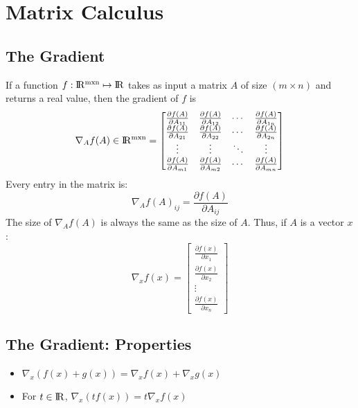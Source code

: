 \documentclass{article}
\begin{document}
\section{Matrix Calculus}
\subsection{The Gradient}
If a function $f:{\rm I\!R^{mxn}} \mapsto {\rm I\!R}$ takes as input a matrix $A$ of size $(m\times n)$ and returns a real value, then the gradient of $f$ is
\newline
$$\nabla_A f(A) \in {\rm I\!R^{mxn}} = \begin{bmatrix}
    \frac{\partial f(A)}{\partial A_{11}} & \frac{\partial f(A)}{\partial A_{12}} & \cdots & \frac{\partial f(A)}{\partial A_{1n}} \\
    \frac{\partial f(A)}{\partial A_{21}} & \frac{\partial f(A)}{\partial A_{22}} & \cdots & \frac{\partial f(A)}{\partial A_{2n}} \\
    \vdots & \vdots & \ddots & \vdots \\
    \frac{\partial f(A)}{\partial A_{m1}} & \frac{\partial f(A)}{\partial A_{m2}} & \cdots & \frac{\partial f(A)}{\partial A_{mn}}
\end{bmatrix}
$$
\newline
Every entry in the matrix is: $$\nabla_A f(A)_{ij} = \frac{\partial f(A)}{\partial A_{ij}}$$
\newline
The size of $\nabla_A f(A)$ is always the same as the size of $A$. Thus, if $A$ is a vector $x$:
$$\nabla_x f(x) = \begin{bmatrix}
	\frac{\partial f(x)}{\partial x_{1}} \\
    \frac{\partial f(x)}{\partial x_{2}} \\
    \vdots \\
    \frac{\partial f(x)}{\partial x_{n}}
\end{bmatrix}
$$
\subsection{The Gradient: Properties}
\begin{itemize}
\item $\nabla_x (f(x) + g(x)) = \nabla_x f(x) + \nabla_x g(x)$
\item For $t \in {\rm I\!R}$, $\nabla_x (t f(x)) = t \nabla_x f(x)$
\end{itemize}
\end{document}
